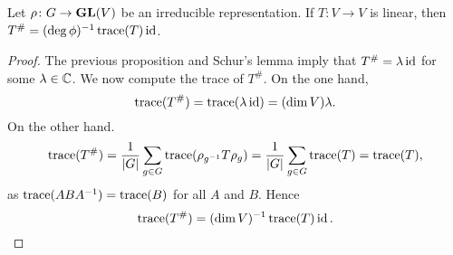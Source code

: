 \begin{theorem}
  Let $\rho\colon G\to\mathbf{GL}(V)$ be an irreducible representation. 
  If $T\colon V\to V$ is linear, then 
  $T^{\#}=(\deg\phi)^{-1}\operatorname{trace}(T)\operatorname{id}$.
\end{theorem}

\begin{proof}
  The previous proposition and Schur's lemma imply that
  $T^{\#}=\lambda\operatorname{id}$ for some $\lambda\in\mathbb{C}$.
  We now compute the trace of $T^{\#}$. On the one hand, 
  \[
	\operatorname{trace}(T^{\#})=\operatorname{trace}(\lambda\operatorname{id})=(\dim V)\lambda.
  \]
  On the other hand.  
  \[
	\operatorname{trace}(T^{\#})
	=\frac{1}{|G|}\sum_{g\in G}\operatorname{trace}(\rho_{g^{-1}}T\rho_g)
	=\frac{1}{|G|}\sum_{g\in G}\operatorname{trace}(T)
	=\operatorname{trace}(T),
  \]
  as $\operatorname{trace}(ABA^{-1})=\operatorname{trace}(B)$ for all $A$ and $B$. 
  Hence 
  \[
  \operatorname{trace}(T^{\#})=(\dim V)^{-1}\operatorname{trace}(T)\operatorname{id}.\qedhere 
  \]
\end{proof}
